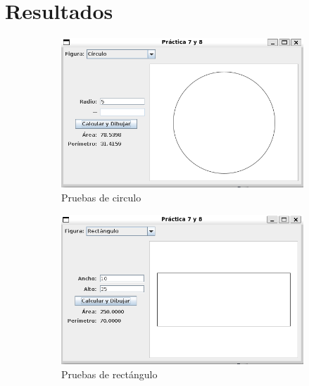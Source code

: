 \documentclass[letterpaper,12pt]{article}
\begin{document}
\clearpage

\section{Resultados}

\begin{figure}[H]
    \centering
    \begin{subfigure}{0.6\textwidth}
        \centering
        \includegraphics[width=\linewidth]{Imagenes/circulo.png}
        \caption*{Pruebas de circulo}
    \end{subfigure}
    \hfill
    \begin{subfigure}{0.6\textwidth}
        \centering
        \includegraphics[width=\linewidth]{Imagenes/rectangulo.png}
        \caption*{Pruebas de rectángulo}
    \end{subfigure}
    \hfill
    \begin{subfigure}{0.6\textwidth}
        \centering

\end{subfigure}
\end{figure}
\end{document}
